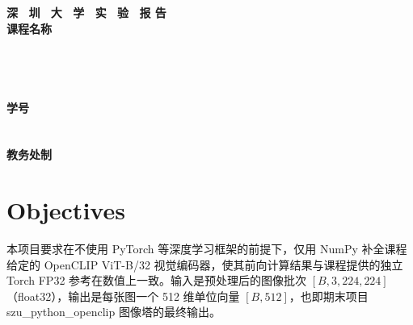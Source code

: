 \documentclass[a4paper,12pt]{article}
\begin{document}
\begin{titlepage}
    \centering
    \vspace*{2cm}
    \Huge{\textbf{深 \ 圳 \ 大 \ 学 \ 实 \ 验  \ 报 告}}\\[1.5cm]
    
    {\Large\textbf{课程名称}\quad\underline{}}\\[0.5cm]
{\Large
\noindent{}
\underline{}}\\[0.5cm]
{\Large
\noindent{}
\underline{}}\\[0.5cm]
{\Large
\noindent{}
\underline{}}\\[0.5cm]
{\Large
\noindent{}
\underline{}}\\[0.5cm]
{\Large
\noindent{}
\underline{}
\hspace{0.5cm}
\textbf{学号}
\underline{}}\\[0.5cm]
{\Large
\noindent{}
\underline{}}\\[0.5cm]
{\Large
\noindent{}
\underline{}}\\[1.5cm]

    \vfill
    \Large{\textbf{教务处制}}
\end{titlepage}

\newpage



\section{Objectives}

本项目要求在不使用 PyTorch 等深度学习框架的前提下，仅用 NumPy 补全课程给定的 OpenCLIP ViT-B/32 视觉编码器，使其前向计算结果与课程提供的独立 Torch FP32 参考在数值上一致。输入是预处理后的图像批次 $[B,3,224,224]$（float32），输出是每张图一个 512 维单位向量 $[B,512]$，也即期末项目 szu\_python\_openclip 图像塔的最终输出。
\end{document}
